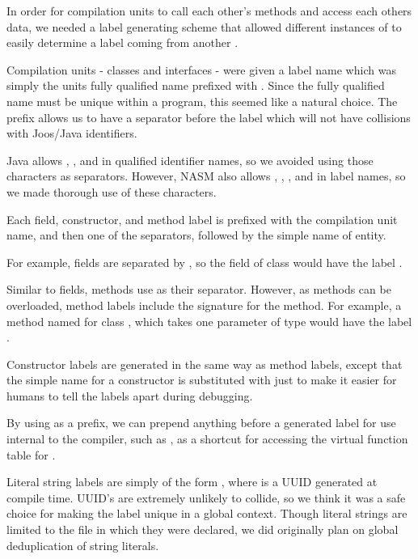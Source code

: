 \documentclass[pdftex,11pt,a4paper]{article}
\begin{document}
In order for compilation units to call each other's methods and access
each others data, we needed a label generating scheme that allowed
different instances of  to easily determine a label
coming from another .

Compilation units - classes and interfaces - were given a label name
which was simply the units fully qualified name prefixed with
. Since the fully qualified name must be unique within a
program, this seemed like a natural choice. The  prefix allows
us to have a separator before the label which will not have collisions
with Joos/Java identifiers.

Java allows \ttt{\$}, \ttt{\_}, and  in qualified identifier
names, so we avoided using those characters as separators. However,
NASM also allows \ttt{\#}, , \ttt{~}, and  in label
names, so we made thorough use of these characters.

Each field, constructor, and method label is prefixed with the
compilation unit name, and then one of the separators, followed by the
simple name of entity.

For example, fields are separated by , so the  field
of  class would have the label
.

Similar to fields, methods use \ttt{~} as their separator. However, as
methods can be overloaded, method labels include the signature for the
method. For example, a method named  for class
, which takes one parameter of type
 would have the label
.

Constructor labels are generated in the same way as method labels,
except that the simple name for a constructor is substituted with
 just to make it easier for humans to tell the labels apart
during debugging.

By using  as a prefix, we can prepend anything before a
generated label for use internal to the compiler, such as
, as a shortcut for accessing the
virtual function table for .

Literal string labels are simply of the form , where
 is a UUID generated at compile time. UUID's are extremely
unlikely to collide, so we think it was a safe choice for making the
label unique in a global context. Though literal strings are limited
to the file in which they were declared, we did originally plan on
global deduplication of string literals.
\end{document}
